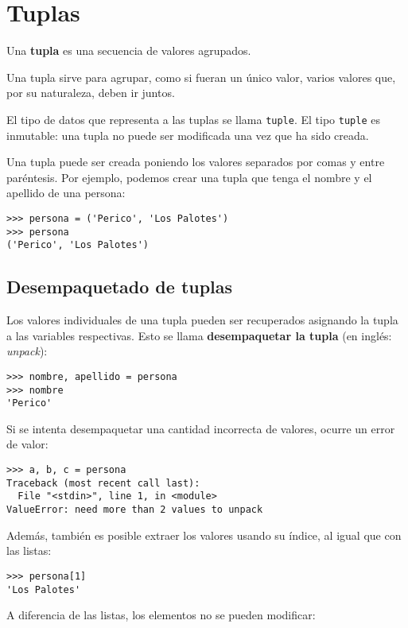 \chapter{Tuplas}

Una \textbf{tupla} es una secuencia de valores agrupados.

Una tupla sirve para agrupar, como si fueran un único valor, varios
valores que, por su naturaleza, deben ir juntos.

El tipo de datos que representa a las tuplas se llama \lstinline!tuple!.
El tipo \lstinline!tuple! es inmutable: una tupla no puede ser
modificada una vez que ha sido creada.

Una tupla puede ser creada poniendo los valores separados por comas y
entre paréntesis. Por ejemplo, podemos crear una tupla que tenga el
nombre y el apellido de una persona:

\begin{lstlisting}
>>> persona = ('Perico', 'Los Palotes')
>>> persona
('Perico', 'Los Palotes')
\end{lstlisting}

\section{Desempaquetado de tuplas}

Los valores individuales de una tupla pueden ser recuperados asignando
la tupla a las variables respectivas. Esto se llama
\textbf{desempaquetar la tupla} (en inglés: \emph{unpack}):

\begin{lstlisting}
>>> nombre, apellido = persona
>>> nombre
'Perico'
\end{lstlisting}

Si se intenta desempaquetar una cantidad incorrecta de valores, ocurre
un error de valor:

\begin{lstlisting}
>>> a, b, c = persona
Traceback (most recent call last):
  File "<stdin>", line 1, in <module>
ValueError: need more than 2 values to unpack
\end{lstlisting}

Además, también es posible extraer los valores usando su índice, al
igual que con las listas:

\begin{lstlisting}
>>> persona[1]
'Los Palotes'
\end{lstlisting}

A diferencia de las listas, los elementos no se pueden modificar:

